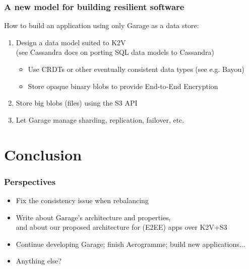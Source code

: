 \documentclass[aspectratio=169]{beamer}
\begin{document}
\begin{frame}
	\frametitle{A new model for building resilient software}
	How to build an application using only Garage as a data store:
	\vspace{1em}
	\begin{enumerate}
		\item Design a data model suited to K2V\\
			{\footnotesize (see Cassandra docs on porting SQL data models to Cassandra)}
			\vspace{1em}
			\begin{itemize}
				\item Use CRDTs or other eventually consistent data types (see e.g. Bayou)
					\vspace{1em}
				\item Store opaque binary blobs to provide End-to-End Encryption\\
			\end{itemize}
			\vspace{1em}
		\item<2-> Store big blobs (files) using the S3 API
			\vspace{1em}
		\item<3-> Let Garage manage sharding, replication, failover, etc.
	\end{enumerate}
\end{frame}

\section{Conclusion}

\begin{frame}
	\frametitle{Perspectives}
	\begin{itemize}
		\item Fix the consistency issue when rebalancing
			\vspace{1em}
		\item Write about Garage's architecture and properties,\\
			and about our proposed architecture for (E2EE) apps over K2V+S3
			\vspace{1em}
		\item Continue developing Garage; finish Aerogramme; build new applications...
			\vspace{1em}
		\item Anything else?
	\end{itemize}
\end{frame}
\end{document}
